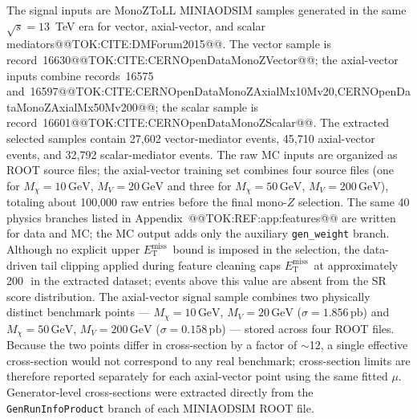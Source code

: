 \documentclass[11pt]{article}
\newcommand{\GeV}{\text{GeV}}
\newcommand{\MET}{\ensuremath{E_{\mathrm{T}}^{\mathrm{miss}}}}
\begin{document}
The signal inputs are MonoZToLL MINIAODSIM samples generated in the same
$\sqrt{s}=13$~TeV era for vector, axial-vector, and scalar mediators@@TOK:CITE:DMForum2015@@.
The vector sample is record~16630@@TOK:CITE:CERNOpenDataMonoZVector@@; the axial-vector inputs
combine records~16575 and~16597@@TOK:CITE:CERNOpenDataMonoZAxialMx10Mv20,CERNOpenDataMonoZAxialMx50Mv200@@;
the scalar sample is record~16601@@TOK:CITE:CERNOpenDataMonoZScalar@@.
The extracted selected samples contain 27,602 vector-mediator events, 45,710 axial-vector
events, and 32,792 scalar-mediator events.
The raw MC inputs are organized as ROOT source files; the axial-vector
training set combines four source files (one for \(M_\chi=10\,\GeV\),
\(M_V=20\,\GeV\) and three for \(M_\chi=50\,\GeV\), \(M_V=200\,\GeV\)),
totaling about 100,000 raw entries before the final mono-$Z$ selection. The same
40 physics branches listed in Appendix~@@TOK:REF:app:features@@ are written for data and MC; the
MC output adds only the auxiliary \texttt{gen\_weight} branch.
Although no explicit upper \MET\ bound is imposed in the selection,
the data-driven tail clipping applied during feature cleaning caps
\MET\ at approximately 200\,\GeV\ in the extracted dataset; events
above this value are absent from the SR score distribution.
The axial-vector signal sample combines two physically distinct
benchmark points --- $M_\chi=10\,\GeV$, $M_V=20\,\GeV$ ($\sigma=1.856\,\mathrm{pb}$)
and $M_\chi=50\,\GeV$, $M_V=200\,\GeV$ ($\sigma=0.158\,\mathrm{pb}$) ---
stored across four ROOT files. Because the two points differ in cross-section
by a factor of $\sim$12, a single effective cross-section would not correspond
to any real benchmark; cross-section limits are therefore reported separately
for each axial-vector point using the same fitted $\mu$.
Generator-level cross-sections were extracted directly from the
\texttt{GenRunInfoProduct} branch of each MINIAODSIM ROOT file.
\end{document}
